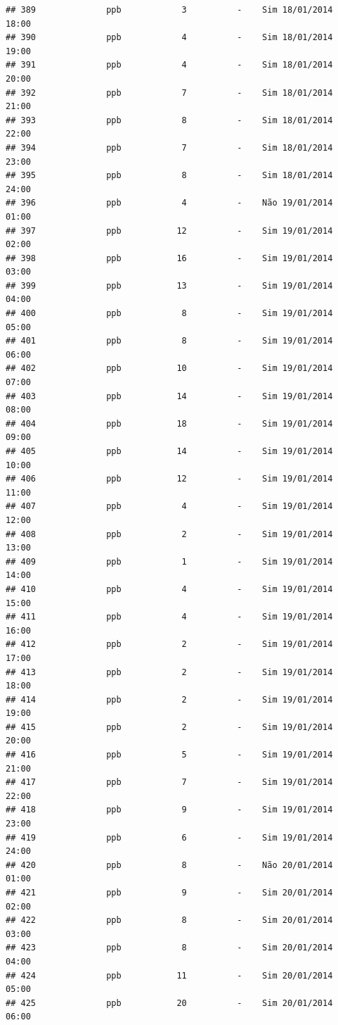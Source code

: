 \documentclass[]{book}
\begin{document}
\begin{verbatim}
## 389              ppb            3          -    Sim 18/01/2014 18:00
## 390              ppb            4          -    Sim 18/01/2014 19:00
## 391              ppb            4          -    Sim 18/01/2014 20:00
## 392              ppb            7          -    Sim 18/01/2014 21:00
## 393              ppb            8          -    Sim 18/01/2014 22:00
## 394              ppb            7          -    Sim 18/01/2014 23:00
## 395              ppb            8          -    Sim 18/01/2014 24:00
## 396              ppb            4          -    Não 19/01/2014 01:00
## 397              ppb           12          -    Sim 19/01/2014 02:00
## 398              ppb           16          -    Sim 19/01/2014 03:00
## 399              ppb           13          -    Sim 19/01/2014 04:00
## 400              ppb            8          -    Sim 19/01/2014 05:00
## 401              ppb            8          -    Sim 19/01/2014 06:00
## 402              ppb           10          -    Sim 19/01/2014 07:00
## 403              ppb           14          -    Sim 19/01/2014 08:00
## 404              ppb           18          -    Sim 19/01/2014 09:00
## 405              ppb           14          -    Sim 19/01/2014 10:00
## 406              ppb           12          -    Sim 19/01/2014 11:00
## 407              ppb            4          -    Sim 19/01/2014 12:00
## 408              ppb            2          -    Sim 19/01/2014 13:00
## 409              ppb            1          -    Sim 19/01/2014 14:00
## 410              ppb            4          -    Sim 19/01/2014 15:00
## 411              ppb            4          -    Sim 19/01/2014 16:00
## 412              ppb            2          -    Sim 19/01/2014 17:00
## 413              ppb            2          -    Sim 19/01/2014 18:00
## 414              ppb            2          -    Sim 19/01/2014 19:00
## 415              ppb            2          -    Sim 19/01/2014 20:00
## 416              ppb            5          -    Sim 19/01/2014 21:00
## 417              ppb            7          -    Sim 19/01/2014 22:00
## 418              ppb            9          -    Sim 19/01/2014 23:00
## 419              ppb            6          -    Sim 19/01/2014 24:00
## 420              ppb            8          -    Não 20/01/2014 01:00
## 421              ppb            9          -    Sim 20/01/2014 02:00
## 422              ppb            8          -    Sim 20/01/2014 03:00
## 423              ppb            8          -    Sim 20/01/2014 04:00
## 424              ppb           11          -    Sim 20/01/2014 05:00
## 425              ppb           20          -    Sim 20/01/2014 06:00

\end{verbatim}
\end{document}
